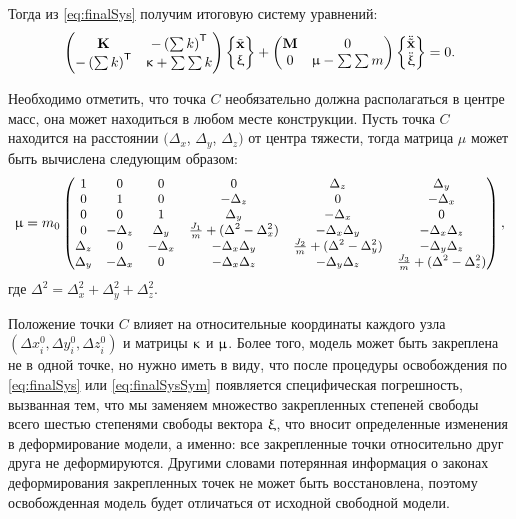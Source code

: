 Тогда из \eqref{eq:finalSys} получим итоговую систему уравнений:
\begin{equation}
	\begin{pmatrix}
		\mathbf{K} & -\left( \sum k \right) ^ \mathsf{T} \\
		 -\left( \sum k \right) ^ \mathsf{T} & \upkappa + \sum \sum k
	\end{pmatrix}
	\begin{Bmatrix}
		\tilde{\mathbf{x}} \\
		\upxi
	\end{Bmatrix}
	+
	\begin{pmatrix}
		\mathbf{M} & 0 \\
		0 & \upmu - \sum \sum m
	\end{pmatrix}
		\begin{Bmatrix}
		\ddot{\tilde{\mathbf{x}}} \\
		\ddot{\upxi}
	\end{Bmatrix}
	= 0.
	\label{eq:finalSysSym}
\end{equation}

Необходимо отметить, что точка $ C $ необязательно должна располагаться в центре масс, она может находиться в любом месте конструкции. Пусть точка $ C $ находится на расстоянии $ (\Delta_x$, $\Delta_y$, $\Delta_z) $ от центра тяжести, тогда матрица $ \mu $ может быть вычислена следующим образом:
\begin{equation}
	\small
	\mathbf{\upmu} = m_0
	\begin{pmatrix}
		1 & 0 & 0 & 0 & \Delta_z & \Delta_y \\
		0 & 1 & 0 & -\Delta_z & 0 & -\Delta_x \\
		0 & 0 & 1 & \Delta_y & -\Delta_x & 0 \\
		0 & -\Delta_z & \Delta_y & \frac{J_1}{m} + (\Delta^2 - \Delta_x^2) & -\Delta_x \Delta_y & -\Delta_x \Delta_z \\
		\Delta_z & 0 & -\Delta_x & -\Delta_x \Delta_y & \frac{J_2}{m} + (\Delta^2 - \Delta_y^2) & -\Delta_y \Delta_z \\
		\Delta_y & - \Delta_x & 0 & -\Delta_x \Delta_z & -\Delta_y \Delta_z & \frac{J_3}{m} + (\Delta^2 - \Delta_z^2)
	\end{pmatrix},
\end{equation}
где $ \Delta^2 = \Delta_x^2 + \Delta_y^2 + \Delta_z^2 $.

Положение точки $ C $ влияет на относительные координаты каждого узла $ (\Delta x^0_i, \Delta y^0_i, \Delta z^0_i) $ и матрицы $ \mathbf{\upkappa} $ и $ \mathbf{\upmu} $. Более того, модель может быть закреплена не в одной точке, но нужно иметь в виду, что после процедуры освобождения по \eqref{eq:finalSys} или \eqref{eq:finalSysSym} появляется специфическая погрешность, вызванная тем, что мы заменяем множество закрепленных степеней свободы всего шестью степенями свободы вектора $ \mathbf{\upxi} $, что вносит определенные изменения в деформирование модели, а именно: все закрепленные точки относительно друг друга не деформируются. Другими словами потерянная информация о законах деформирования закрепленных точек не может быть восстановлена, поэтому освобожденная модель будет отличаться от исходной свободной модели.

